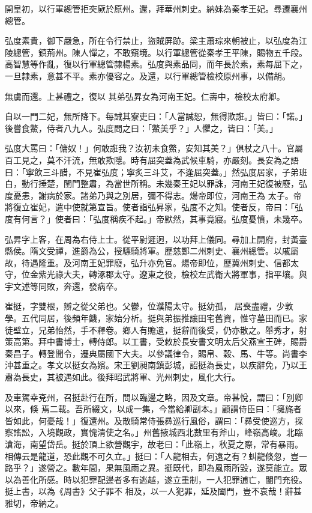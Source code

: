 \begin{pinyinscope}
 開皇初，以行軍總管拒突厥於原州。還，拜華州刺史。納妹為秦孝王妃。尋遷襄州總管。



 弘度素貴，御下嚴急，所在令行禁止，盜賊屏跡。梁主蕭琮來朝被止，以弘度為江陵總管，鎮荊州。陳人憚之，不敢窺境。以行軍總管從秦孝王平陳，賜物五千段。高智慧等作亂，復以行軍總管隸楊素。弘度與素品同，而年長於素，素每屈下之，一旦隸素，意甚不平。素亦優容之。及還，以行軍總管檢校原州事，以備胡。



 無虜而還。上甚禮之，復以
 其弟弘昇女為河南王妃。仁壽中，檢校太府卿。



 自以一門二妃，無所降下。每誡其寮吏曰：「人當誠恕，無得欺誑。」皆曰：「諾。」後嘗食鱉，侍者八九人。弘度問之曰：「鱉美乎？」人懼之，皆曰：「美。」



 弘度大罵曰：「傭奴！」何敢誑我？汝初未食鱉，安知其美？」俱杖之八十。官屬百工見之，莫不汗流，無敢欺隱。時有屈突蓋為武候車騎，亦嚴刻。長安為之語曰：「寧飲三斗醋，不見崔弘度；寧炙三斗艾，不逢屈突蓋。」然弘度居家，子弟班白，動行捶楚，閨門整肅，為當世所稱。未幾秦王妃以罪誅，河南王妃復被廢，弘度憂恚，謝病於家。諸弟乃與之別居，彌不得志。煬帝即位，河南王為
 太子。帝將復立崔妃，遣中使就第宣旨。使者詣弘昇家，弘度不之知。使者反，帝曰：「弘度有何言？」使者曰：「弘度稱疾不起。」帝默然，其事竟寢。弘度憂憤，未幾卒。



 弘昇字上客，在周為右侍上士。從平尉遲迥，以功拜上儀同。尋加上開府，封黃臺縣侯。隋文受禪，進爵為公，授驃騎將軍。歷慈鄭二州刺史、襄州總管。以戚屬故，待遇隆重。及河南王妃罪廢，弘升亦免官。煬帝即位，歷冀州刺史、信都太守，位金紫光祿大夫，轉涿郡太守。遼東之役，檢校左武衛大將軍事，指平壤。與宇文述等同敗，奔還，發病卒。



 崔挺，字雙根，辯之從父弟也。父鬱，位濮陽太守。挺幼孤，
 居喪盡禮，少敦學。五代同居，後頻年饑，家始分析。挺與弟振推讓田宅舊資，惟守墓田而已。家徒壁立，兄弟怡然，手不釋卷。鄉人有贍遺，挺辭而後受，仍亦散之。舉秀才，射策高第。拜中書博士，轉侍郎。以工書，受敕於長安書文明太后父燕宣王碑，賜爵秦昌子。轉登聞令，遷典屬國下大夫。以參議律令，賜帛、穀、馬、牛等。尚書李沖甚重之。孝文以挺女為嬪。宋王劉昶南鎮彭城，詔挺為長史，以疾辭免，乃以王肅為長史，其被遇如此。後拜昭武將軍、光州刺史，風化大行。



 及車駕幸兗州，召挺赴行在所，問以臨邊之略，因及文章。帝甚悅，謂曰：「別卿以來，倏
 焉二載。吾所綴文，以成一集，今當給卿副本。」顧謂侍臣曰：「擁旄者皆如此，何憂哉！」復還州。及散騎常侍張彞巡行風俗，謂曰：「彞受使巡方，採察謠訟，入境觀政，實愧清使之名。」州舊掖城西北數里有斧山，峰嶺高峻。北臨滄海，南望岱岳。挺於頂上欲營觀宇，故老曰：「此嶺上，秋夏之際，常有暴雨。相傳云是龍道，恐此觀不可久立。」挺曰：「人龍相去，何遠之有？虯龍倏忽，豈一路乎？」遂營之。數年間，果無風雨之異。挺既代，即為風雨所毀，遂莫能立。眾以為善化所感。時以犯罪配邊者多有逃越，遂立重制，一人犯罪逋亡，闔門充役。挺上書，以為《周書》父子罪不
 相及，以一人犯罪，延及闔門，豈不哀哉！辭甚雅切，帝納之。




\end{pinyinscope}
